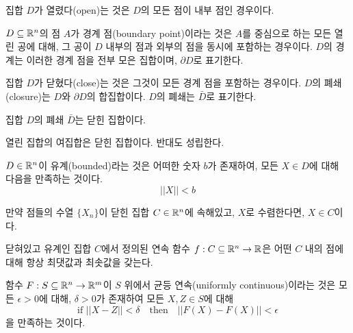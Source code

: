 \begin{definition}[열린 집합]
집합 $D$가 열렸다(open)는 것은 $D$의 모든 점이 내부 점인 경우이다.
\end{definition}

\begin{definition}[경계 점]
$D \subseteq \mathbb{R}^n$의 점 $A$가 경계 점(boundary point)이라는 것은 $A$를 중심으로 하는 모든 열린 공에 대해, 그 공이 $D$ 내부의 점과 외부의 점을 동시에 포함하는 경우이다. $D$의 경계는 이러한 경계 점을 전부 모은 집합이며, $\partial D$로 표기한다.
\end{definition}

\begin{definition}[닫힌 집합]
집합 $D$가 닫혔다(close)는 것은 그것이 모든 경계 점을 포함하는 경우이다. $D$의 폐쇄(closure)는 $D$와 $\partial D$의 합집합이다. $D$의 폐쇄는 $\bar D$로 표기한다.
\end{definition}

\begin{theorem}
집합 $D$의 폐쇄 $\bar D$는 닫힌 집합이다.
\end{theorem}

\begin{theorem}
열린 집합의 여집합은 닫힌 집합이다. 반대도 성립한다.
\end{theorem}

\begin{definition}[유계]
$D \in \mathbb{R}^n$이 유계(bounded)라는 것은 어떠한 숫자 $b$가 존재하여, 모든 $X \in D$에 대해 다음을 만족하는 것이다.
$$
||X|| < b
$$
\end{definition}

\begin{theorem}
만약 점들의 수열 $\{X_n\}$이 닫힌 집합 $C \in \mathbb{R}^n$에 속해있고, $X$로 수렴한다면, $X \in C$이다.
\end{theorem}

\begin{theorem}
닫혀있고 유계인 집합 $C$에서 정의된 연속 함수 $f: C \subseteq \mathbb{R}^n \to \mathbb{R}$은 어떤 $C$ 내의 점에 대해 항상 최댓값과 최솟값을 갖는다.
\end{theorem}

\begin{definition}[균등 연속]
함수 $F: S \subseteq \mathbb{R}^n \to \mathbb{R}^m$이 $S$ 위에서 균등 연속(uniformly continuous)이라는 것은 모든 $\epsilon > 0$에 대해, $\delta > 0$가 존재하여 모든 $X, Z \in S$에 대해
$$
\text{if } ||X-Z||<\delta \quad \text{then} \quad ||F(X)-F(X)||<\epsilon
$$
을 만족하는 것이다.
\end{definition}

